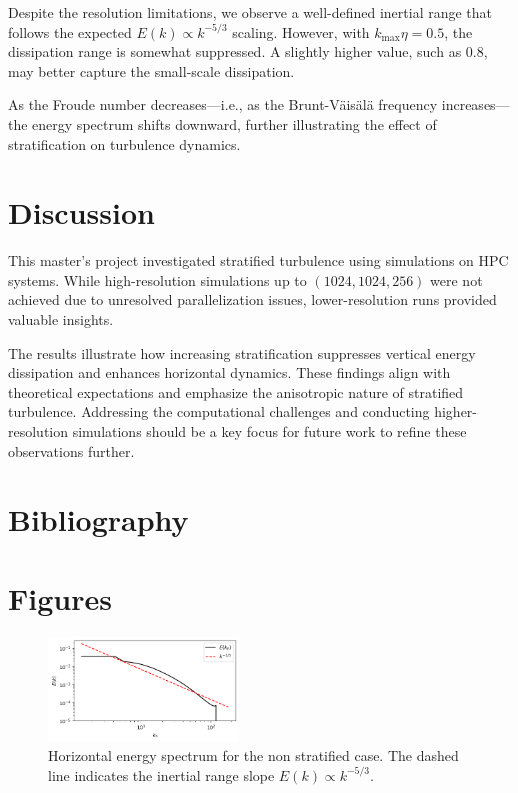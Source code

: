 \documentclass[final,5p,times,twocolumn,authoryear]{elsarticle}
\begin{document}
Despite the resolution limitations, we observe a well-defined inertial range that follows the expected $E(k) \propto k^{-5/3}$ scaling. However, with $k_{\max} \eta = 0.5$, the dissipation range is somewhat suppressed. A slightly higher value, such as $0.8$, may better capture the small-scale dissipation.

As the Froude number decreases—i.e., as the Brunt-Väisälä frequency increases—the energy spectrum shifts downward, further illustrating the effect of stratification on turbulence dynamics.


\section{Discussion}

This master’s project investigated stratified turbulence using simulations on HPC systems. While high-resolution simulations up to $(1024, 1024, 256)$ were not achieved due to unresolved parallelization issues, lower-resolution runs provided valuable insights.

The results illustrate how increasing stratification suppresses vertical energy dissipation and enhances horizontal dynamics. These findings align with theoretical expectations and emphasize the anisotropic nature of stratified turbulence. Addressing the computational challenges and conducting higher-resolution simulations should be a key focus for future work to refine these observations further.

\appendix

\section{Bibliography}

 


\section{Figures}

\begin{figure}[h]
	\centering
	\includegraphics[width=0.45\textwidth]{fig/iso_Ekh_kh.png}
	\caption{Horizontal energy spectrum for the non stratified case. The dashed line indicates the inertial range slope $E(k) \propto k^{-5/3}$. } 
	\label{fig:iso horizontal spectrum}
\end{figure}
\end{document}
